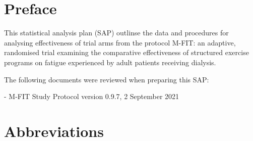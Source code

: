 \documentclass[11pt,parskip=half-]{scrartcl}
\begin{document}
\clearpage

\section*{Preface}
\label{preface}

This statistical analysis plan (SAP) outlinse the data and procedures for analysing effectiveness of trial arms from the protocol M-FIT: an adaptive, randomised trial examining the comparative effectiveness of structured exercise programs on fatigue experienced by adult patients receiving dialysis.

The following documents were reviewed when preparing this SAP:

- M-FIT Study Protocol version 0.9.7, 2 September 2021

\clearpage

\section*{Abbreviations}
\label{abbreviations}
\end{document}
